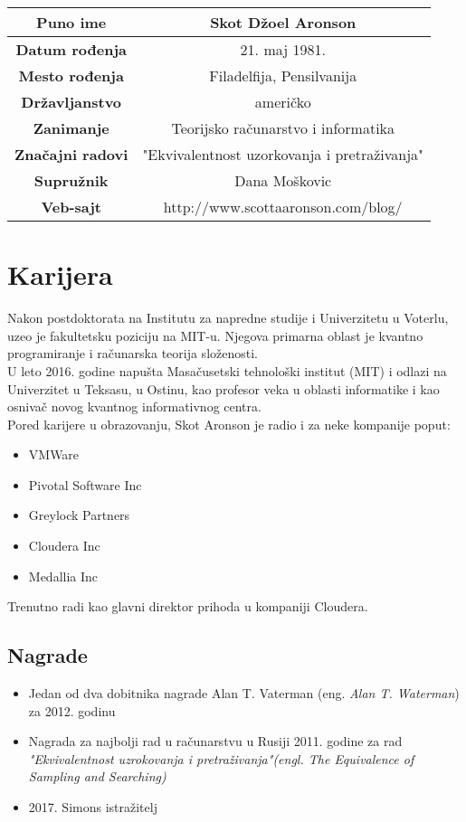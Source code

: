 \documentclass[a4paper]{article}
\begin{document}
{\begin{table}[h!]
\begin{center}
\hspace*{0.1cm}\begin{tabular}{|c|c|}
\textbf{Puno ime} & Skot Džoel Aronson\\ \hline
\textbf{Datum rođenja} & 21. maj 1981. \\ \hline
\textbf{Mesto rođenja} & Filadelfija, Pensilvanija\\ \hline
\textbf{Državljanstvo} & američko\\ \hline
\textbf{Zanimanje} & Teorijsko računarstvo i informatika\\ \hline
\textbf{Značajni radovi}  & "Ekvivalentnost uzorkovanja i pretraživanja"\\ \hline
\textbf{Supružnik} & Dana Moškovic\\ \hline
\textbf{Veb-sajt} & http://www.scottaaronson.com/blog/ \\ \hline

\end{tabular}
\label{tab:Slika1}

\end{center}
\end{table}

\newpage
\section{Karijera}
Nakon postdoktorata na Institutu za napredne studije i Univerzitetu u Voterlu, 
uzeo je fakultetsku poziciju na MIT-u. Njegova primarna oblast je kvantno programiranje i računarska teorija složenosti. 
\\[1\baselineskip]
U leto 2016. godine napušta Masačusetski tehnološki institut (MIT) i odlazi na Univerzitet u Teksasu, 
u Ostinu, kao profesor veka u oblasti informatike i kao osnivač novog kvantnog informativnog centra.
\\[1\baselineskip]
Pored karijere u obrazovanju, Skot Aronson je radio i za neke kompanije poput:
\begin{itemize}
\item VMWare
\item Pivotal Software Inc
\item Greylock Partners
\item Cloudera Inc
\item Medallia Inc
\end{itemize}
Trenutno radi kao glavni direktor prihoda u kompaniji Cloudera.


\subsection{Nagrade}
\begin{itemize}
\item Jedan od dva dobitnika nagrade Alan T. Vaterman (eng. \textit{Alan T. Waterman}) za 2012. godinu 
\item Nagrada za najbolji rad u računarstvu u Rusiji 2011. godine za rad \textit{"Ekvivalentnost uzrokovanja i pretraživanja"(engl. The Equivalence of Sampling and Searching)} 
\item 2017. Simons istražitelj
\end{itemize}



}
\end{document}
